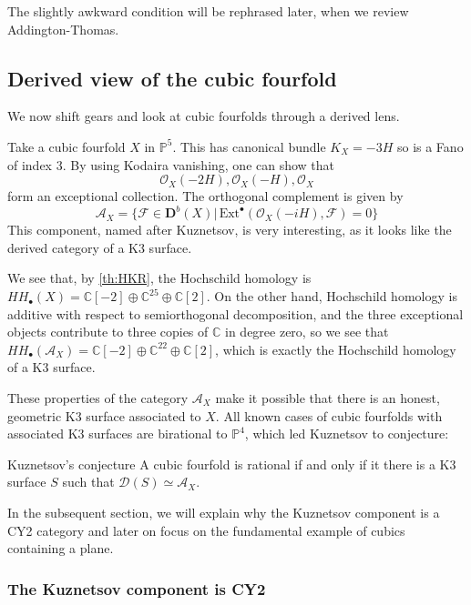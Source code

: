 The slightly awkward condition will be rephrased later, when we review Addington-Thomas.

\subsection{Derived view of the cubic fourfold}

We now shift gears and look at cubic fourfolds through a derived lens.

Take a cubic fourfold $X$ in $\mathbb{P}^5$. This has canonical bundle $K_{X}=-3H$ so is a Fano of index 3. By using Kodaira vanishing, one can show that $$\mathcal{O}_{X}(-2H), \mathcal{O}_{X}(-H), \mathcal{O}_{X}$$form an exceptional collection. The orthogonal complement is given by $$\mathcal{A}_{X}=\{\mathcal{F}\in \mathbf{D}^b(X)|\,\mathrm{Ext}^\bullet(\mathcal{O}_{X}(-iH), \mathcal{F})=0\}$$This component, named after Kuznetsov, is very interesting, as it looks like the derived category of a K3 surface.

We see that, by \ref{th:HKR}, the Hochschild homology is $HH_\bullet(X)=\mathbb{C}[-2]\oplus \mathbb{C}^{25}\oplus \mathbb{C}[2]$. On the other hand, Hochschild homology is additive with respect to semiorthogonal decomposition, and the three exceptional objects contribute to three copies of $\mathbb{C}$ in degree zero, so we see that $HH_\bullet(\mathcal{A}_X)=\mathbb{C}[-2]\oplus \mathbb{C}^{22}\oplus \mathbb{C}[2]$, which is exactly the Hochschild homology of a K3 surface.

These properties of the category $\mathcal{A}_X$ make it possible that there is an honest, geometric K3 surface associated to $X$. All known cases of cubic fourfolds with associated K3 surfaces are birational to $\mathbb{P}^4$, which led Kuznetsov to conjecture:

\begin{conjecture}{}{Kuznetsov's conjecture}
A cubic fourfold is rational if and only if it there is a K3 surface $S$ such that $\mathcal{D}(S)\simeq \mathcal{A}_X$.
\end{conjecture}

In the subsequent section, we will explain why the Kuznetsov component is a CY2 category and later on focus on the fundamental example of cubics containing a plane.

\subsubsection{The Kuznetsov component is CY2}

